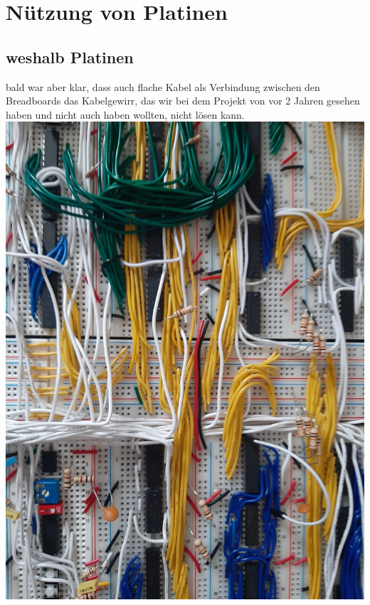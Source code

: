 \documentclass{scrartcl}
\begin{document}
    \section{Nützung von Platinen}
    \subsection{weshalb Platinen}
    bald war aber klar, dass auch flache Kabel als Verbindung zwischen den Breadboards das Kabelgewirr, das wir bei dem Projekt von vor 2 Jahren gesehen haben
    und nicht auch haben wollten, nicht lösen kann.
    \includegraphics{Computer_V01_Chaos_07}
\end{document}
